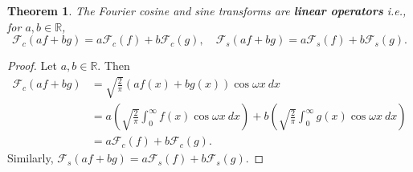 \documentclass[12pt,openany]{book}
\newtheorem{theorem}{Theorem}[chapter]
\theoremstyle{definition}
\newcommand{\R}{\mathbb{R}}
\newcommand{\of}[1]{\left( #1 \right)}
\begin{document}
	\begin{tcolorbox}[colframe=thmcolor, title={\color{white}\bf Linearity of Fourier Cosine and Sine Transforms}]
		\begin{theorem}
			The Fourier cosine and sine transforms are \textbf{linear operators} i.e., for \(a, b \in \mathbb{R}\),
			\[
			\mathcal{F}_c(af + bg) = a\mathcal{F}_c(f) + b\mathcal{F}_c(g),\quad
			\mathcal{F}_s(af + bg) = a\mathcal{F}_s(f) + b\mathcal{F}_s(g).
			\]
		\end{theorem}
	\end{tcolorbox}
	\begin{proof}
		Let $a,b\in\R$. Then \begin{align*}
			\mathcal{F}_c(af+bg)&=\sqrt{\frac{2}{\pi}}\of{af(x)+bg(x)}\cos\omega x\ dx\\
			&=a\of{\sqrt{\frac{2}{\pi}}\int_0^\infty f(x)\cos\omega x\ dx}+b\of{\sqrt{\frac{2}{\pi}}\int_0^\infty g(x)\cos\omega x\ dx}\\
			&=a\mathcal{F}_c(f)+b\mathcal{F}_c(g).
		\end{align*} Similarly, $\mathcal{F}_s(af + bg) = a\mathcal{F}_s(f) + b\mathcal{F}_s(g)$.
	\end{proof}
	
\end{document}
